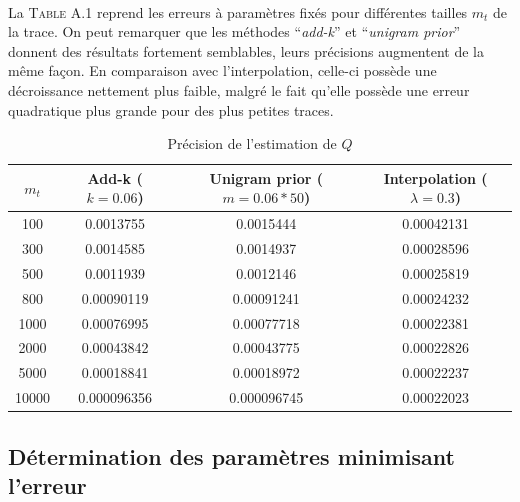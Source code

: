 \documentclass[a4paper,titlepage]{report}
\begin{document}
\paragraph{}
La \textsc{Table A.1} reprend les erreurs à paramètres fixés pour différentes tailles $m_t$ de la trace. On peut remarquer que les méthodes ``\textit{add-k}'' et ``\textit{unigram prior}'' donnent des résultats fortement semblables, leurs précisions augmentent de la même façon. En comparaison avec l'interpolation, celle-ci possède une décroissance nettement plus faible, malgré le fait qu'elle possède une erreur quadratique plus grande pour des plus petites traces. 
\begin{table}[h]
	\center
	\begin{tabular}{c|ccc}
	$m_t$ & Add-k ($k = 0.06$) & Unigram prior ($m = 0.06 * 50$) & Interpolation ($\lambda = 0.3$)\\
	\hline
	100 & \num{0.0013755} & \num{0.0015444} & \num{0.00042131}\\
	300 & \num{0.0014585} & \num{0.0014937} & \num{0.00028596}\\
	500 & \num{0.0011939} & \num{0.0012146} & \num{0.00025819}\\
	800 & \num{0.00090119} & \num{0.00091241} & \num{0.00024232}\\
	1000 & \num{0.00076995} & \num{0.00077718} & \num{0.00022381}\\
	2000 & \num{0.00043842} & \num{0.00043775} & \num{0.00022826}\\
	5000 & \num{0.00018841} & \num{0.00018972} & \num{0.00022237}\\	
	10000 & \num{0.000096356} & \num{0.000096745} & \num{0.00022023}\\	
	\end{tabular}
	\caption{Précision de l'estimation de $Q$}
	\label{tab:}
\end{table}

\subsection{Détermination des paramètres minimisant l'erreur}
\end{document}
